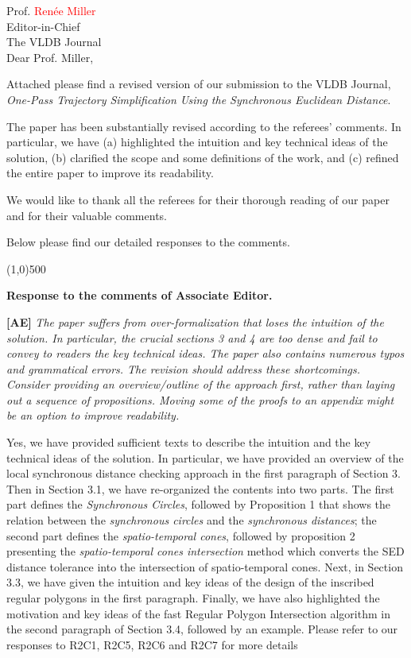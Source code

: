 \documentclass{letter}
\newcommand{\marked}[1]{\textcolor{red}{#1}}
\begin{document}
Prof. \marked{Renée Miller} \\
Editor-in-Chief		\\
The VLDB Journal	\\



Dear Prof. Miller,

Attached please find a revised version of our submission to
the VLDB Journal, \emph{One-Pass Trajectory Simplification Using the Synchronous Euclidean Distance}.


The paper has been substantially revised according to the referees' comments. In particular, we have {(a) highlighted the intuition and key technical ideas of the solution, (b) clarified the scope and some definitions of the work, and (c) refined the entire paper to improve its readability.}

We would like to thank all the referees for their thorough reading of our paper and for their valuable comments.

Below please find our detailed responses to the comments.


\line(1,0){500}

\textbf{Response to the comments of Associate Editor.}

\textbf{[AE]} \emph{The paper suffers from over-formalization that loses the intuition of the solution. In particular, the crucial sections 3 and 4 are too dense and fail to convey to readers the key technical ideas. The paper also contains numerous typos and grammatical errors. The revision should address these shortcomings. Consider providing an overview/outline of the approach first, rather than laying out a sequence of propositions. Moving some of the proofs to an appendix might be an option to improve readability. }

Yes, we have provided sufficient texts to describe the intuition and the key technical ideas of the solution. In particular, we have provided an overview of the local synchronous distance checking approach in the first paragraph of Section 3. Then in Section 3.1, we have re-organized the contents into two parts. The first part defines the \emph{Synchronous Circles}, followed by Proposition 1 that shows the relation between the \textit{synchronous circles} and the \textit{synchronous distances}; the second part defines the \textit{spatio-temporal cones}, followed by proposition 2 presenting the \textit{spatio-temporal cones intersection} method which converts the SED distance tolerance into the intersection of spatio-temporal cones.
Next, in Section 3.3, we have given the intuition and key ideas of the design of the inscribed regular polygons in the first paragraph.
Finally, we have also highlighted the motivation and key ideas of the fast Regular Polygon Intersection algorithm in the second paragraph of Section 3.4, followed by an example.
Please refer to our responses to R2C1, R2C5, R2C6 and R2C7 for more details
\end{document}
